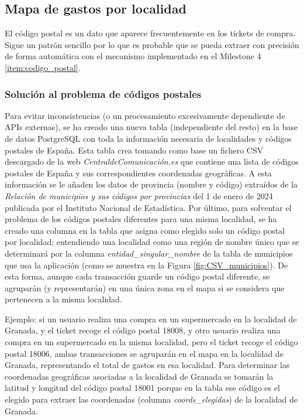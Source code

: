 \subsection{Mapa de gastos por localidad}
El código postal es un dato que aparece frecuentemente en los tickets de compra. Sigue un patrón sencillo por lo que es probable que se pueda extraer con precisión de forma automática con el mecanismo implementado en el Milestone 4 \ref{item:codigo_postal}. 


\subsubsection{Solución al problema de códigos postales}
Para evitar inconsistencias (o un procesamiento excesivamente dependiente de APIs externas), se ha creado una nueva tabla (independiente del resto) en la base de datos PostgreSQL con toda la información necesaria de localidades y códigos postales de España. Esta tabla crea tomando como base un fichero CSV descargado de la web \textit{CentraldeComunicación.es} que contiene una lista de códigos postales de España y sus correspondientes coordenadas geográficas. A esta información se le añaden los datos de provincia (nombre y código) extraídos de la \textit{Relación de municipios y sus códigos por provincias} del 1 de enero de 2024 publicada por el Instituto Nacional de Estadística. Por último, para solventar el problema de los códigos postales diferentes para una misma localidad, se ha creado una columna en la tabla que asigna como elegido solo un código postal por localidad; entendiendo una localidad como una región de nombre único que se determinará por la columna \textit{entidad\_singular\_nombre} de la tabla de municipios que usa la aplicación (como se muestra en la Figura \ref{fig:CSV_municipios}). De esta forma, aunque cada transacción guarde un código postal diferente, se agruparán (y representarán) en una única zona en el mapa si se considera que pertenecen a la misma localidad.

Ejemplo: si un usuario realiza una compra en un supermercado en la localidad de Granada, y el ticket recoge el código postal 18008, y otro usuario realiza una compra en un supermercado en la misma localidad, pero el ticket recoge el código postal 18006, ambas transacciones se agruparán en el mapa en la localidad de Granada, representando el total de gastos en esa localidad. Para determinar las coordenadas geográficas asociadas a la localidad de Granada se tomarán la latitud y longitud del código postal 18001 porque en la tabla ese código es el elegido para extraer las coordenadas (columna \textit{coords\_elegidas}) de la localidad de Granada.

